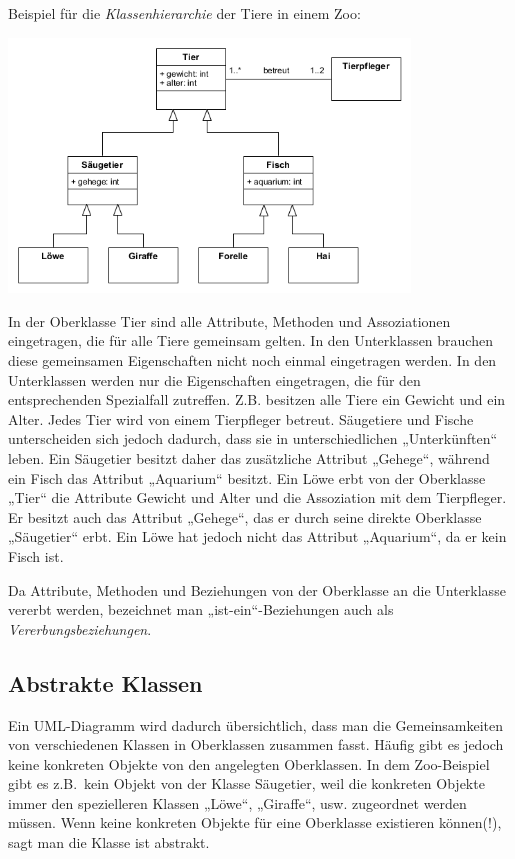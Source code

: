 Beispiel für die \emph{Klassenhierarchie} der Tiere in einem Zoo:

\begin{center}
\includegraphics[width=0.8\textwidth]{./inf/SEKII/15_UML_Klassendiagramme/Zoo.png}
\end{center}

In der Oberklasse Tier sind alle Attribute, Methoden und Assoziationen
eingetragen, die für alle Tiere gemeinsam gelten. In den Unterklassen brauchen
diese gemeinsamen Eigenschaften nicht noch einmal eingetragen werden. In den
Unterklassen werden nur die Eigenschaften eingetragen, die für den
entsprechenden Spezialfall zutreffen. Z.B. besitzen alle Tiere ein Gewicht und
ein Alter. Jedes Tier wird von einem Tierpfleger betreut. Säugetiere und Fische
unterscheiden sich jedoch dadurch, dass sie in unterschiedlichen „Unterkünften“
leben. Ein Säugetier besitzt daher das zusätzliche Attribut „Gehege“, während
ein Fisch das Attribut „Aquarium“ besitzt. Ein Löwe erbt von der Oberklasse
„Tier“ die Attribute Gewicht und Alter und die Assoziation mit dem Tierpfleger.
Er besitzt auch das Attribut „Gehege“, das er durch seine direkte Oberklasse
„Säugetier“ erbt. Ein Löwe hat jedoch nicht das Attribut „Aquarium“, da er kein
Fisch ist.

Da Attribute, Methoden und Beziehungen von der Oberklasse an die Unterklasse
vererbt werden, bezeichnet man „ist-ein“-Beziehungen auch als
\emph{Vererbungsbeziehungen}.


\subsection{Abstrakte Klassen}

Ein UML-Diagramm wird dadurch übersichtlich, dass man die Gemeinsamkeiten von
verschiedenen Klassen in Oberklassen zusammen fasst. Häufig gibt es jedoch
keine konkreten Objekte von den angelegten Oberklassen. In dem Zoo-Beispiel
gibt es z.B.\ kein Objekt von der Klasse Säugetier, weil die konkreten Objekte
immer den spezielleren Klassen „Löwe“, „Giraffe“, usw. zugeordnet werden
müssen. Wenn keine konkreten Objekte für eine Oberklasse existieren können(!),
sagt man die Klasse ist abstrakt.